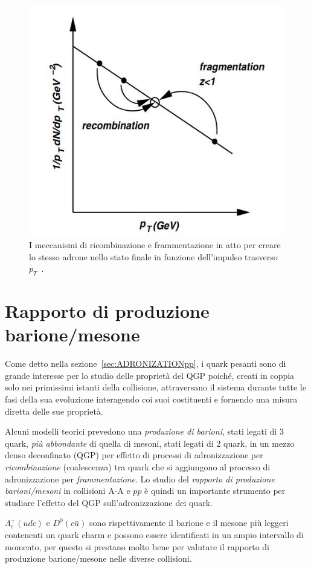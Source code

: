     \begin{figure}[h]
        \centering
        \includegraphics[width=0.61\linewidth]{res/fig/1-chapter/7-fragm-recom.jpg}
        \caption{I meccanismi di ricombinazione e frammentazione in atto per creare lo stesso adrone nello stato finale in funzione dell'impulso trasverso $p_{T}$~\cite{Vogt_2007}.}
        \label{fig:7-fragm-recom}
    \end{figure}

\newpage

\section{Rapporto di produzione barione/mesone}
\label{sec:BARIONE/MESONE}
    Come detto nella sezione~\ref{sec:ADRONIZATIONpp}, i quark pesanti sono di grande interesse per lo studio delle proprietà del QGP poiché, creati in coppia solo nei primissimi istanti della collisione, attraversano il sistema durante tutte le fasi della sua evoluzione interagendo coi suoi costituenti e fornendo una misura diretta delle sue proprietà.

    Alcuni modelli teorici prevedono una \textit{produzione di barioni}, stati legati di 3 quark, \textit{più abbondante} di quella di mesoni, stati legati di 2 quark, in un mezzo denso deconfinato (QGP) per effetto di processi di adronizzazione per \textit{ricombinazione} (coalescenza) tra quark che si aggiungono al processo di adronizzazione per \textit{frammentazione}. Lo studio del \textit{rapporto di produzione barioni/mesoni} in collisioni A-A e $pp$ è quindi un importante strumento per studiare l'effetto del QGP sull'adronizzazione dei quark.

    $\Lambda_{c}^{+}(udc)$ e $D^{0}(c \bar{u})$ sono rispettivamente il barione e il mesone più leggeri contenenti un quark charm e possono essere identificati in un ampio intervallo di momento, per questo si prestano molto bene per valutare il rapporto di produzione barione/mesone nelle diverse collisioni.

